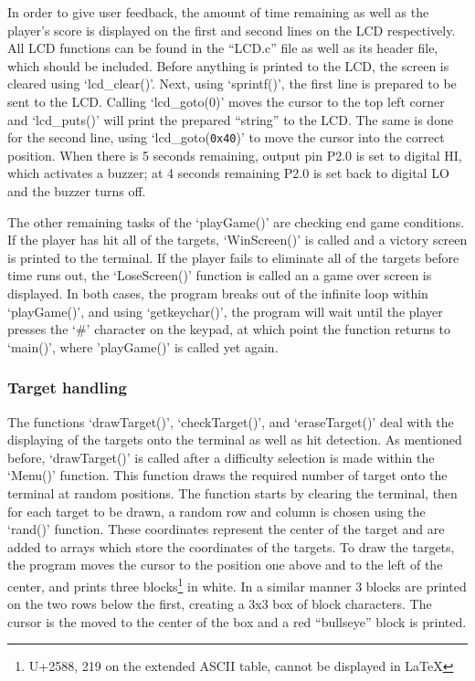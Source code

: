 \documentclass[12pt]{article}
\begin{document}
In order to give user feedback, the amount of time remaining as well as the player's score is displayed on the first and second lines on the LCD respectively. All LCD functions can be found in the ``LCD.c'' file as well as its header file, which should be included. Before anything is printed to the LCD, the screen is cleared using `lcd\_clear()'. Next, using `sprintf()', the first line is prepared to be sent to the LCD. Calling `lcd\_goto(0)' moves the cursor to the top left corner and `lcd\_puts()' will print the prepared ``string'' to the LCD. The same is done for the second line, using `lcd\_goto(\texttt{0x40})' to move the cursor into the correct position. When there is 5 seconds remaining, output pin P2.0 is set to digital HI, which activates a buzzer; at 4 seconds remaining P2.0 is set back to digital LO and the buzzer turns off. 

The other remaining tasks of the `playGame()' are checking end game conditions. If the player has hit all of the targets, `WinScreen()' is called and a victory screen is printed to the terminal. If the player fails to eliminate all of the targets before time runs out, the `LoseScreen()' function is called an a game over screen is displayed. In both cases, the program breaks out of the infinite loop within `playGame()', and using `getkeychar()', the program will wait until the player presses the `\#' character on the keypad, at which point the function returns to `main()', where 'playGame()' is called yet again. 

\subsubsection{Target handling}
The functions `drawTarget()', `checkTarget()', and `eraseTarget()' deal with the displaying of the targets onto the terminal as well as hit detection. As mentioned before, `drawTarget()' is called after a difficulty selection is made within the `Menu()' function. This function draws the required number of target onto the terminal at random positions. The function starts by clearing the terminal, then for each target to be drawn, a random row and column is chosen using the `rand()' function. These coordinates represent the center of the target and are added to arrays which store the coordinates of the targets. To draw the targets, the program moves the cursor to the position one above and to the left of the center, and prints three blocks\footnote{U+2588, 219 on the extended ASCII table, cannot be displayed in \LaTeX} in white. In a similar manner 3 blocks are printed on the two rows below the first, creating a 3x3 box of block characters. The cursor is the moved to the center of the box and a red ``bullseye'' block is printed. 
\end{document}
